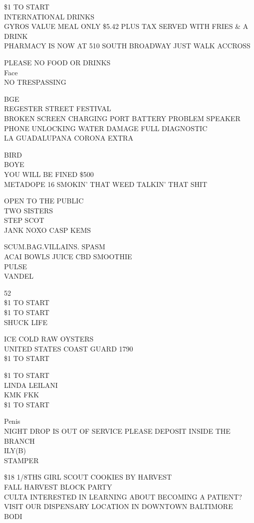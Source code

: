 \documentclass[10pt,letterpaper]{article}
\begin{document}
\$1 TO START\\
INTERNATIONAL DRINKS\\
GYROS VALUE MEAL ONLY \$5.42 PLUS TAX SERVED WITH FRIES \& A DRINK\\
PHARMACY IS NOW AT 510 SOUTH BROADWAY JUST WALK ACCROSS

PLEASE NO FOOD OR DRINKS\\
Face\\
NO TRESPASSING

BGE\\
REGESTER STREET FESTIVAL\\
BROKEN SCREEN CHARGING PORT BATTERY PROBLEM SPEAKER PHONE UNLOCKING WATER DAMAGE FULL DIAGNOSTIC\\
LA GUADALUPANA CORONA EXTRA

BIRD\\
BOYE\\
YOU WILL BE FINED \$500\\
METADOPE 16 SMOKIN' THAT WEED TALKIN' THAT SHIT

OPEN TO THE PUBLIC\\
TWO SISTERS\\
STEP SCOT\\
JANK NOXO CASP KEMS

SCUM.BAG.VILLAINS. SPASM\\
ACAI BOWLS JUICE CBD SMOOTHIE\\
PULSE\\
VANDEL

52\\
\$1 TO START\\
\$1 TO START\\
SHUCK LIFE

ICE COLD RAW OYSTERS\\
UNITED STATES COAST GUARD 1790\\
\$1 TO START

\$1 TO START\\
LINDA LEILANI\\
KMK FKK\\
\$1 TO START

Penis\\
NIGHT DROP IS OUT OF SERVICE PLEASE DEPOSIT INSIDE THE BRANCH\\
ILY(B)\\
STAMPER

\$18 1/8THS GIRL SCOUT COOKIES BY HARVEST\\
FALL HARVEST BLOCK PARTY\\
CULTA INTERESTED IN LEARNING ABOUT BECOMING A PATIENT?  VISIT OUR DISPENSARY LOCATION IN DOWNTOWN BALTIMORE\\
BODI
\end{document}
